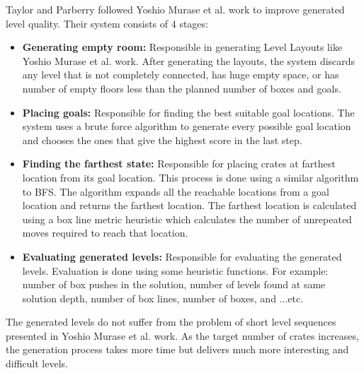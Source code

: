 Taylor and Parberry\cite{sokobanLevelGenerationNew} followed Yoshio Murase et al.\cite{sokobanLevelGenerationOld} work to improve generated level quality. Their system consists of 4 stages:
\begin{itemize} \itemsep0pt \parskip0pt 
	\item \textbf{Generating empty room:} Responsible in generating Level Layouts like Yoshio Murase et al.\cite{sokobanLevelGenerationOld} work. After generating the layouts, the system discards any level that is not completely connected, has huge empty space, or has number of empty floors less than the planned number of boxes and goals.
	\item \textbf{Placing goals:} Responsible for finding the best suitable goal locations. The system uses a brute force algorithm to generate every possible goal location and chooses the ones that give the highest score in the last step.
	\item \textbf{Finding the farthest state:} Responsible for placing crates at farthest location from its goal location. This process is done using a similar algorithm to BFS. The algorithm expands all the reachable locations from a goal location and returns the farthest location. The farthest location is calculated using a box line metric heuristic which calculates the number of unrepeated moves required to reach that location.
	\item \textbf{Evaluating generated levels:} Responsible for evaluating the generated levels. Evaluation is done using some heuristic functions. For example: number of box pushes in the solution, number of levels found at same solution depth, number of box lines, number of boxes, and ...etc.  
\end{itemize}
The generated levels do not suffer from the problem of short level sequences presented in Yoshio Murase et al.\cite{sokobanLevelGenerationOld} work. As the target number of crates increases, the generation process takes more time but delivers much more interesting and difficult levels.


